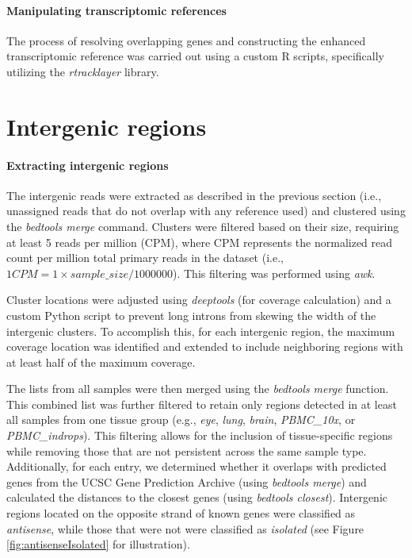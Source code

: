 \paragraph{Manipulating transcriptomic references}

The process of resolving overlapping genes and constructing the enhanced transcriptomic reference
was carried out using a custom R scripts, specifically utilizing the \textit{rtracklayer} library.

\section{Intergenic regions}

\paragraph{Extracting intergenic regions}

The intergenic reads were extracted as described in the previous section (i.e., unassigned reads that
do not overlap with any reference used) and clustered using the \textit{bedtools merge} command.
Clusters were filtered based on their size, requiring at least 5 reads per million (CPM),
where CPM represents the normalized read count per million total primary reads in the dataset
(i.e., $1 CPM = 1 \times sample\_size / 1000000$). This filtering was performed using \textit{awk}.

Cluster locations were adjusted using \textit{deeptools} (for coverage calculation)
and a custom Python script to prevent long introns from skewing the width of the intergenic clusters.
To accomplish this, for each intergenic region, the maximum coverage location was identified and extended to include neighboring regions with at least half of the maximum coverage.

The lists from all samples were then merged using the \textit{bedtools merge} function.
This combined list was further filtered to retain only regions detected in at least all samples from one tissue group
(e.g., \textit{eye}, \textit{lung}, \textit{brain}, \textit{PBMC\_10x}, or \textit{PBMC\_indrops}).
This filtering allows for the inclusion of tissue-specific regions while removing those that
are not persistent across the same sample type.
Additionally, for each entry, we determined whether it overlaps with predicted genes from the UCSC Gene Prediction Archive (using \textit{bedtools merge})
and calculated the distances to the closest genes (using \textit{bedtools closest}).
Intergenic regions located on the opposite strand of known genes were classified as \textit{antisense},
while those that were not were classified as \textit{isolated} (see Figure \ref{fig:antisenseIsolated} for illustration).

